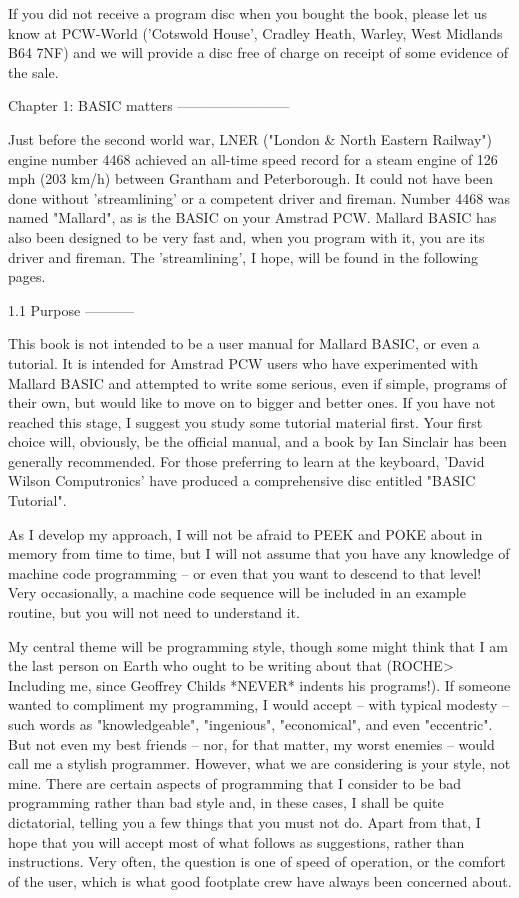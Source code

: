 If you did not receive a program disc when you bought the book, please let  us 
know at PCW-World ('Cotswold House', Cradley Heath, Warley, West Midlands  B64 
7NF) and we will provide a disc free of charge on receipt of some evidence  of 
the sale.


Chapter 1: BASIC matters
------------------------

Just  before  the second world war, LNER ("London &  North  Eastern  Railway") 
engine number 4468 achieved an all-time speed record for a steam engine of 126 
mph (203 km/h) between Grantham and Peterborough. It could not have been  done 
without  'streamlining'  or a competent driver and fireman.  Number  4468  was 
named  "Mallard", as is the BASIC on your Amstrad PCW. Mallard BASIC has  also 
been  designed  to  be very fast and, when you program with it,  you  are  its 
driver and fireman. The 'streamlining', I hope, will be found in the following 
pages.


1.1 Purpose
-----------

This  book  is not intended to be a user manual for Mallard BASIC, or  even  a 
tutorial.  It  is intended for Amstrad PCW users who  have  experimented  with 
Mallard BASIC and attempted to write some serious, even if simple, programs of 
their  own, but would like to move on to bigger and better ones. If  you  have 
not reached this stage, I suggest you study some tutorial material first. Your 
first  choice  will,  obviously, be the official manual, and  a  book  by  Ian 
Sinclair has been generally recommended. For those preferring to learn at  the 
keyboard,  'David  Wilson  Computronics' have produced  a  comprehensive  disc 
entitled "BASIC Tutorial".

As  I  develop  my approach, I will not be afraid to PEEK and  POKE  about  in 
memory from time to time, but I will not assume that you have any knowledge of 
machine  code programming -- or even that you want to descend to  that  level! 
Very  occasionally,  a machine code sequence will be included  in  an  example 
routine, but you will not need to understand it.

My central theme will be programming style, though some might think that I  am 
the last person on Earth who ought to be writing about that (ROCHE>  Including 
me, since Geoffrey Childs *NEVER* indents his programs!). If someone wanted to 
compliment  my  programming, I would accept -- with typical  modesty  --  such 
words as "knowledgeable", "ingenious", "economical", and even "eccentric". But 
not  even my best friends -- nor, for that matter, my worst enemies  --  would 
call me a stylish programmer. However, what we are considering is your  style, 
not  mine. There are certain aspects of programming that I consider to be  bad 
programming  rather  than  bad style and, in these cases,  I  shall  be  quite 
dictatorial, telling you a few things that you must not do. Apart from that, I 
hope  that  you will accept most of what follows as suggestions,  rather  than 
instructions.  Very often, the question is one of speed of operation,  or  the 
comfort  of  the  user, which is what good footplate  crew  have  always  been 
concerned about.

